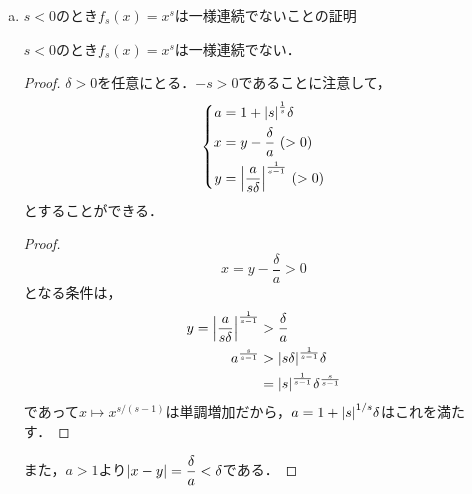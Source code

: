 \begin{enumerate}[(1)]
\begin{enumerate}[(i)]
\begin{enumerate}[(a)]
            \begin{proposition}
                $s=0$のとき$f_0(x)=1$は一様連続である．
            \end{proposition}
            \begin{proof}
                任意の$x,y$に対し
                \begin{align}
                    \abs{f(x)-f(y)}=0
                \end{align}
                が成り立つ．よって$f_0(x)=1$は一様連続である．
            \end{proof}
            \item $s<0$のとき$f_s(x)=x^s$は一様連続でないことの証明
            \begin{proposition}
                $s<0$のとき$f_s(x)=x^s$は一様連続でない．
            \end{proposition}
            \begin{proof}
                $\delta>0$を任意にとる．$-s>0$であることに注意して，
                \begin{equation}
                    \left\{
                        \begin{aligned}
                            a&=1+\abs{s}^{\frac{1}{s}}\delta\\
                            x&=y-\frac{\delta}{a}\ (>0)\\
                            y&=\abs{\frac{a}{s\delta}}^{\frac{1}{s-1}}\ (>0)
                        \end{aligned}
                    \right.
                \end{equation}
                とすることができる．
                \begin{proof}
                    \begin{equation}
                        x
                        =y-\frac{\delta}{a}
                        >0
                    \end{equation}
                    となる条件は，
                    \begin{align}
                        y=\abs{\frac{a}{s\delta}}^{\frac{1}{s-1}}&>\frac{\delta}{a}\\
                        a^{\frac{s}{s-1}}
                        &>\abs{s\delta}^{\frac{1}{s-1}}\delta\\
                        &=\abs{s}^{\frac{1}{s-1}}\delta^{\frac{s}{s-1}}
                    \end{align}
                    であって$x \mapsto x^{s/(s-1)}$は単調増加だから，$a=1+\abs{s}^{1/s}\delta$はこれを満たす．
                \end{proof}
                また，$a>1$より$\abs{x-y}=\dfrac{\delta}{a}<\delta$である．
                

\end{proof}
\end{enumerate}
\end{enumerate}
\end{enumerate}
